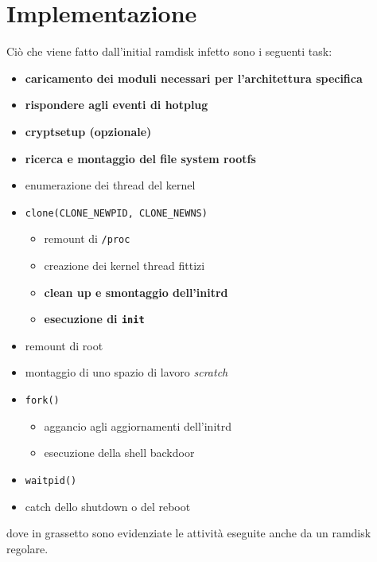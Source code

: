 \documentclass{article}
\begin{document}
\section{Implementazione}
Ciò che viene fatto dall'initial ramdisk infetto sono i seguenti task:
\begin{itemize}
	\item \textbf{caricamento dei moduli necessari per l'architettura specifica}
	\item \textbf{rispondere agli eventi di hotplug}
	\item \textbf{cryptsetup (opzionale)}
	\item \textbf{ricerca e montaggio del file system rootfs}
	\item enumerazione dei thread del kernel
	\item \texttt{clone(CLONE\_NEWPID, CLONE\_NEWNS)}
	\begin{itemize}
		\item remount di \texttt{/proc}
		\item creazione dei kernel thread fittizi
		\item \textbf{clean up e smontaggio dell'initrd}
		\item \textbf{esecuzione di \texttt{init}}
	\end{itemize}
	\item remount di root
	\item montaggio di uno spazio di lavoro \textsl{scratch}
	\item \texttt{fork()}
	\begin{itemize}
		\item aggancio agli aggiornamenti dell'initrd
		\item esecuzione della shell backdoor
	\end{itemize}
	\item \texttt{waitpid()}
	\item catch dello shutdown o del reboot
\end{itemize}
dove in grassetto sono evidenziate le attività eseguite anche da un ramdisk regolare.
\end{document}
